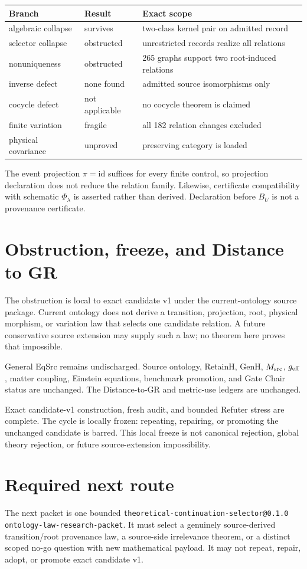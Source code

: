 \documentclass[11pt]{article}
\begin{document}
\begin{center}
\begin{tabular}{lll}
\toprule
Branch & Result & Exact scope \\
\midrule
algebraic collapse & survives & two-class kernel pair on admitted record \\
selector collapse & obstructed & unrestricted records realize all relations \\
nonuniqueness & obstructed & 265 graphs support two root-induced relations \\
inverse defect & none found & admitted source isomorphisms only \\
cocycle defect & not applicable & no cocycle theorem is claimed \\
finite variation & fragile & all 182 relation changes excluded \\
physical covariance & unproved & preserving category is loaded \\
\bottomrule
\end{tabular}
\end{center}

The event projection \(\pi=\mathrm{id}\) suffices for every finite control, so
projection declaration does not reduce the relation family. Likewise,
certificate compatibility with schematic \(\Phi_\lambda\) is asserted rather
than derived. Declaration before \(B_U\) is not a provenance certificate.

\section{Obstruction, freeze, and Distance to GR}

The obstruction is local to exact candidate v1 under the current-ontology
source package. Current ontology does not derive a transition, projection,
root, physical morphism, or variation law that selects one candidate relation.
A future conservative source extension may supply such a law; no theorem here
proves that impossible.

General EqSrc remains undischarged. Source ontology, RetainH, GenH,
\(M_{\rm src}\), \(g_{\rm eff}\), matter coupling, Einstein equations,
benchmark promotion, and Gate Chair status are unchanged. The Distance-to-GR
and metric-use ledgers are unchanged.

Exact candidate-v1 construction, fresh audit, and bounded Refuter stress are
complete. The cycle is locally frozen: repeating, repairing, or promoting the
unchanged candidate is barred. This local freeze is not canonical rejection,
global theory rejection, or future source-extension impossibility.

\section{Required next route}

The next packet is one bounded
\texttt{theoretical-continuation-selector@0.1.0}
\texttt{ontology-law-research-packet}. It must select a genuinely
source-derived transition/root provenance law, a source-side irrelevance
theorem, or a distinct scoped no-go question with new mathematical payload.
It may not repeat, repair, adopt, or promote exact candidate v1.
\end{document}
